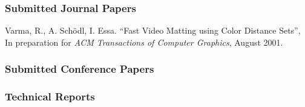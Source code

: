 \subsubsection{Submitted Journal Papers}
\label{subsubsec:submitted-journal}

\begin{pub}



\item Varma, R., A. Sch\"{o}dl, I. Essa. ``Fast Video Matting
using Color Distance Sets'', In preparation for \textit{ACM
Transactions of Computer Graphics}, August 2001.
\label{pub:video-matting01}

\end{pub}

\subsubsection{Submitted Conference Papers}
\label{subsubsec:submitted-conf}




\subsubsection{Technical Reports}
\label{subsubsec:technical-reports}

